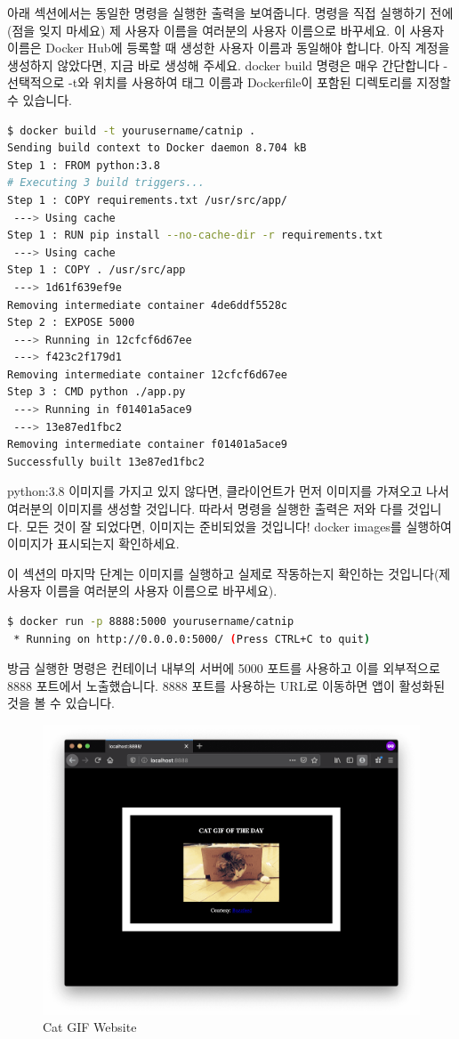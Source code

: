 아래 섹션에서는 동일한 명령을 실행한 출력을 보여줍니다. 명령을 직접 실행하기 전에(점을 잊지 마세요) 제 사용자 이름을 여러분의 사용자 이름으로 바꾸세요. 이 사용자 이름은 Docker Hub에 등록할 때 생성한 사용자 이름과 동일해야 합니다. 아직 계정을 생성하지 않았다면, 지금 바로 생성해 주세요. docker build 명령은 매우 간단합니다 - 선택적으로 -t와 위치를 사용하여 태그 이름과 Dockerfile이 포함된 디렉토리를 지정할 수 있습니다.
\begin{lstlisting}[language=bash]
$ docker build -t yourusername/catnip .
Sending build context to Docker daemon 8.704 kB
Step 1 : FROM python:3.8
# Executing 3 build triggers...
Step 1 : COPY requirements.txt /usr/src/app/
 ---> Using cache
Step 1 : RUN pip install --no-cache-dir -r requirements.txt
 ---> Using cache
Step 1 : COPY . /usr/src/app
 ---> 1d61f639ef9e
Removing intermediate container 4de6ddf5528c
Step 2 : EXPOSE 5000
 ---> Running in 12cfcf6d67ee
 ---> f423c2f179d1
Removing intermediate container 12cfcf6d67ee
Step 3 : CMD python ./app.py
 ---> Running in f01401a5ace9
 ---> 13e87ed1fbc2
Removing intermediate container f01401a5ace9
Successfully built 13e87ed1fbc2
\end{lstlisting}

python:3.8 이미지를 가지고 있지 않다면, 클라이언트가 먼저 이미지를 가져오고 나서 여러분의 이미지를 생성할 것입니다. 따라서 명령을 실행한 출력은 저와 다를 것입니다. 모든 것이 잘 되었다면, 이미지는 준비되었을 것입니다! docker images를 실행하여 이미지가 표시되는지 확인하세요.

이 섹션의 마지막 단계는 이미지를 실행하고 실제로 작동하는지 확인하는 것입니다(제 사용자 이름을 여러분의 사용자 이름으로 바꾸세요).
\begin{lstlisting}[language=bash]
$ docker run -p 8888:5000 yourusername/catnip
 * Running on http://0.0.0.0:5000/ (Press CTRL+C to quit)
\end{lstlisting}

방금 실행한 명령은 컨테이너 내부의 서버에 5000 포트를 사용하고 이를 외부적으로 8888 포트에서 노출했습니다. 8888 포트를 사용하는 URL로 이동하면 앱이 활성화된 것을 볼 수 있습니다.

\begin{figure}
\includegraphics[width=\textwidth]{images/catgif.png}
\caption{Cat GIF Website}
\end{figure}

